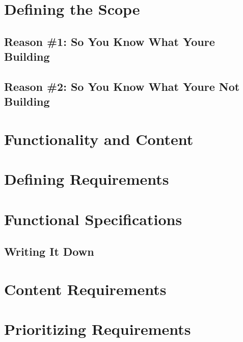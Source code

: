 \section{Defining the Scope}
\subsection{Reason \#1: So You Know What Youre Building}
\subsection{Reason \#2: So You Know What Youre Not Building}
\section{Functionality and Content}
\section{Defining Requirements}
\section{Functional Specifications}
\subsection{Writing It Down}
\section{Content Requirements}
\section{Prioritizing Requirements}